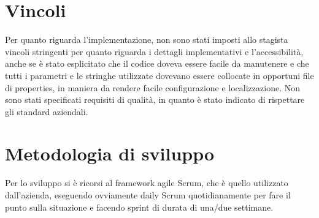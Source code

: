 \section{Vincoli}
Per quanto riguarda l'implementazione, non sono stati imposti allo stagista vincoli stringenti per quanto riguarda i dettagli implementativi e l'accessibilità, anche se è stato esplicitato che il codice doveva essere facile da manutenere e che tutti i parametri e le stringhe utilizzate dovevano essere collocate in opportuni file di properties, in maniera da rendere facile configurazione e localizzazione. Non sono stati specificati requisiti di qualità, in quanto è stato indicato di rispettare gli standard aziendali.
\section{Metodologia di sviluppo}
Per lo sviluppo si è ricorsi al framework agile Scrum, che è quello utilizzato dall'azienda, eseguendo ovviamente daily Scrum quotidianamente per fare il punto sulla situazione e facendo sprint di durata di una/due settimane.
